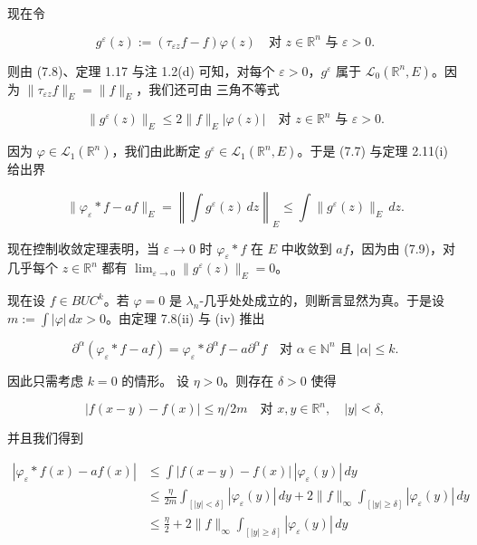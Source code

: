 \begin{theorem}
\begin{subitems}
现在令

\[
g^{\varepsilon}(z) := (\tau_{\varepsilon z}f - f)\varphi(z) \quad \text{对 } z \in \mathbb{R}^{n} \text{ 与 } \varepsilon > 0 .
\]

则由 (7.8)、定理 1.17 与注 1.2(d) 可知，对每个 $ \varepsilon > 0 $，$ g^{\varepsilon} $ 属于 $ \mathcal{L}_{0}(\mathbb{R}^{n},E) $。因为 $ \|\tau_{\varepsilon z}f\|_{E} = \|f\|_{E} $，我们还可由
三角不等式

\[
\|g^{\varepsilon}(z)\|_{E} \le 2\|f\|_{E}|\varphi(z)| \quad \text{对 } z \in \mathbb{R}^{n} \text{ 与 } \varepsilon > 0 .
\]

因为 $ \varphi \in \mathcal{L}_{1}(\mathbb{R}^{n}) $，我们由此断定 $ g^{\varepsilon} \in \mathcal{L}_{1}(\mathbb{R}^{n},E) $。于是 (7.7) 与定理 2.11(i) 给出界

\[
\|\varphi_{\varepsilon} * f - af\|_{E} = \left\|\int g^{\varepsilon}(z)\,dz\right\|_{E} \le \int\|g^{\varepsilon}(z)\|_{E}\,dz .
\]

现在控制收敛定理表明，当 $ \varepsilon \to 0 $ 时 $ \varphi_{\varepsilon} * f $ 在 $ E $ 中收敛到 $ af $，因为由 (7.9)，对几乎每个 $ z \in \mathbb{R}^{n} $ 都有 $ \lim_{\varepsilon \to 0}\|g^{\varepsilon}(z)\|_{E} = 0 $。

\item

现在设 $ f \in BUC^{k} $。若 $ \varphi = 0 $ 是 $ \lambda_{n} $-几乎处处成立的，则断言显然为真。于是设 $ m := \int|\varphi|\,dx > 0 $。由定理 7.8(ii) 与 (iv) 推出

\[
\partial^{\alpha}(\varphi_{\varepsilon} * f - af) = \varphi_{\varepsilon} * \partial^{\alpha}f - a\partial^{\alpha}f \quad \text{对 } \alpha \in \mathbb{N}^{n} \text{ 且 } |\alpha| \le k .
\]

因此只需考虑 $ k = 0 $ 的情形。
设 $ \eta > 0 $。则存在 $ \delta > 0 $ 使得

\[
|f(x - y) - f(x)| \le \eta/2m \quad \text{对 } x, y \in \mathbb{R}^{n} ,\quad |y| < \delta ,
\]

并且我们得到

\begin{equation}
\begin{aligned}
|\varphi_{\varepsilon} * f(x) - af(x)| &\le \int|f(x - y) - f(x)|\,|\varphi_{\varepsilon}(y)|\,dy \\ &\le \frac{\eta}{2m}\int_{[|y|<\delta]}|\varphi_{\varepsilon}(y)|\,dy + 2\|f\|_{\infty}\int_{[|y|\ge\delta]}|\varphi_{\varepsilon}(y)|\,dy \\ &\le \frac{\eta}{2} + 2\|f\|_{\infty}\int_{[|y|\ge\delta]}|\varphi_{\varepsilon}(y)|\,dy
\end{aligned}\tag{7.10}
\end{equation}


\end{subitems}
\end{theorem}
